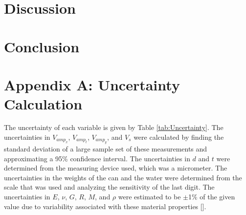 \documentclass[10pt,journal,letterpaper]{IEEEtran}
\begin{document}
\section{Discussion}

\lipsum[11-20]

\section{Conclusion}

\lipsum[21]

\section*{Appendix A: Uncertainty Calculation}

The uncertainty of each variable is given by Table \ref{tab:Uncertainty}.
The uncertainties in $V_{amp_{x}}$, $V_{amp_{t}}$, $V_{amp_{y}}$, and $V_{s}$ were calculated by finding the standard deviation of a large sample set of these measurements and approximating a 95\% confidence interval.
The uncertainties in $d$ and $t$ were determined from the measuring device used, which was a micrometer.
The uncertainties in the weights of the can and the water were determined from the scale that was used and analyzing the sensitivity of the last digit.
The uncertainties in $E$, $\nu$, $G$, $R$, $M$, and $\rho$ were estimated to be $\pm$1\% of the given value due to variability associated with these material properties [\todo].
\end{document}
